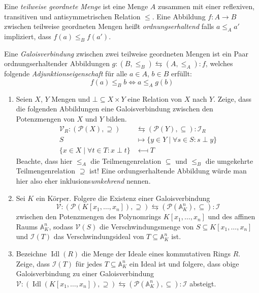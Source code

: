\documentclass{uebungsblatt}
\DeclareMathOperator{\Idl}{Idl}
\begin{document}

Eine \emph{teilweise geordnete Menge} ist eine Menge $A$ zusammen mit einer reflexiven, transitiven und antisymmetrischen Relation $≤$.
Eine Abbildung $f:A → B$ zwischen teilweise geordneten Mengen heißt \emph{ordnungserhaltend} falls $a ≤_A a'$ impliziert, dass $f(a) ≤_B f(a')$.

\begin{exercise}[Galoisverbindungen]
  Eine \emph{Galoisverbindung} zwischen zwei teilweise geordneten Mengen ist ein Paar ordnungserhaltender Abbildungen $g:(B,≤_B) ⇆ (A,≤_A):f$, welches folgende \emph{Adjunktionseigenschaft} für alle $a ∈ A$, $b ∈ B$ erfüllt:
  $$
  f(a) ≤_B b ⇔ a ≤_A g(b)
  $$
  \begin{enumerate}
    \item Seien $X$, $Y$ Mengen und $⊥ ⊆ X × Y$ eine Relation von $X$ nach $Y$.
      Zeige, dass die folgenden Abbildungen eine Galoisverbindung zwischen den Potenzmengen von $X$ und $Y$ bilden.
      \begin{align*}
        𝒱_R : (𝒫(X),⊇) &\leftrightarrows (𝒫(Y),⊆) : ℐ_R\\
        S & \longmapsto \{y ∈ Y \mid ∀s ∈ S:s \perp y\}\\
        \{x ∈ X \mid ∀t ∈ T:x \perp t\} & \longmapsfrom T
      \end{align*}
      {\scriptsize Beachte, dass hier $≤_A$ die Teilmengenrelation $⊆$ und $≤_B$ die umgekehrte Teilmengenrelation $⊇$ ist!
      Eine ordungserhaltende Abbildung würde man hier also eher inklusions\emph{umkehrend} nennen.}
    \item Sei $K$ ein Körper.
      Folgere die Existenz einer Galoisverbindung
      $$
      𝒱:(𝒫(K[x_1,\dots,x_n]),⊇) ⇆ (𝒫(𝔸^n_K),⊆):ℐ
      $$
      zwischen den Potenzmengen des Polynomrings $K[x_1,\dots,x_n]$ und des affinen Raums $𝔸^n_K$, sodass $𝒱(S)$ die Verschwindungsmenge von $S⊆K[x_1,\dots,x_n]$ und $ℐ(T)$ das Verschwindungsideal von $T⊆𝔸^n_K$ ist.
    \item Bezeichne $\Idl(R)$ die Menge der Ideale eines kommutativen Rings $R$.
      Zeige, dass $ℐ(T)$ für jedes $T⊆𝔸^n_K$ ein Ideal ist und folgere, dass obige Galoisverbindung zu einer Galoisverbindung $𝒱:(\Idl(K[x_1,\dots,x_n]),⊇) ⇆ (𝒫(𝔸^n_K),⊆):ℐ$ absteigt.

\end{enumerate}
\end{exercise}
\end{document}
